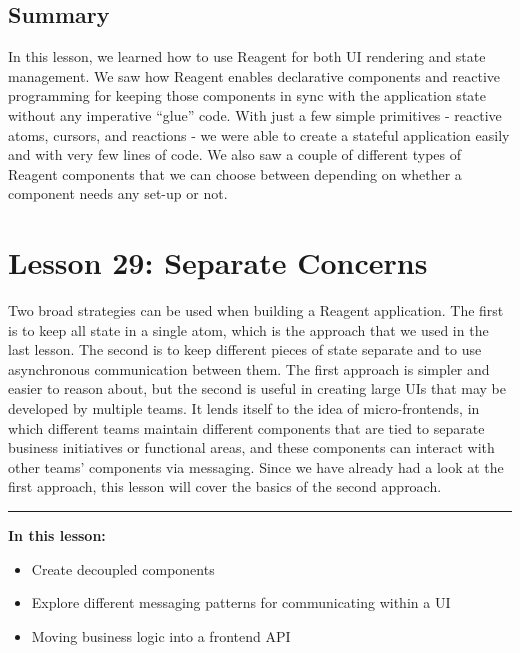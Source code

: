 \documentclass[10pt,twoside,openright]{memoir}
\begin{document}
\section{Summary}

In this lesson, we learned how to use Reagent for both UI rendering and
state management. We saw how Reagent enables declarative components and
reactive programming for keeping those components in sync with the
application state without any imperative ``glue'' code. With just a few
simple primitives - reactive atoms, cursors, and reactions - we were
able to create a stateful application easily and with very few lines of
code. We also saw a couple of different types of Reagent components that
we can choose between depending on whether a component needs any set-up
or not.


\chapter{Lesson 29: Separate Concerns}

Two broad strategies can be used when building a Reagent application.
The first is to keep all state in a single atom, which is the approach
that we used in the last lesson. The second is to keep different pieces
of state separate and to use asynchronous communication between them.
The first approach is simpler and easier to reason about, but the second
is useful in creating large UIs that may be developed by multiple teams.
It lends itself to the idea of micro-frontends, in which different teams
maintain different components that are tied to separate business
initiatives or functional areas, and these components can interact with
other teams' components via messaging. Since we have already had a look
at the first approach, this lesson will cover the basics of the second
approach.

\begin{center}\rule{0.5\linewidth}{0.5pt}\end{center}

\textbf{In this lesson:}

\begin{itemize}
\tightlist
\item
  Create decoupled components
\item
  Explore different messaging patterns for communicating within a UI
\item
  Moving business logic into a frontend API
\end{itemize}
\end{document}
